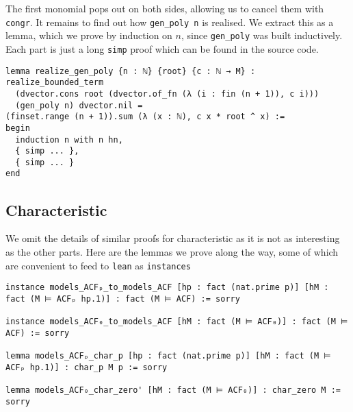 The first monomial pops out on both sides,
allowing us to cancel them with \texttt{congr}.
It remains to find out how \texttt{gen\_poly n} is realised.
We extract this as a lemma,
which we prove by induction on $n$, since \texttt{gen\_poly} was built inductively.
Each part is just a long \texttt{simp} proof which can be found in the source code.

\begin{lstlisting}
lemma realize_gen_poly {n : ℕ} {root} {c : ℕ → M} :
realize_bounded_term
  (dvector.cons root (dvector.of_fn (λ (i : fin (n + 1)), c i)))
  (gen_poly n) dvector.nil =
(finset.range (n + 1)).sum (λ (x : ℕ), c x * root ^ x) :=
begin
  induction n with n hn,
  { simp ... },
  { simp ... }
end\end{lstlisting}

\subsection{Characteristic}

We omit the details of similar proofs for characteristic as it is not
as interesting as the other parts.
Here are the lemmas we prove along the way,
some of which are convenient to feed to \texttt{lean} as \texttt{instances}

\begin{lstlisting}
instance models_ACFₚ_to_models_ACF [hp : fact (nat.prime p)] [hM : fact (M ⊨ ACFₚ hp.1)] : fact (M ⊨ ACF) := sorry

instance models_ACF₀_to_models_ACF [hM : fact (M ⊨ ACF₀)] : fact (M ⊨ ACF) := sorry

lemma models_ACFₚ_char_p [hp : fact (nat.prime p)] [hM : fact (M ⊨ ACFₚ hp.1)] : char_p M p := sorry

lemma models_ACF₀_char_zero' [hM : fact (M ⊨ ACF₀)] : char_zero M := sorry

\end{lstlisting}
